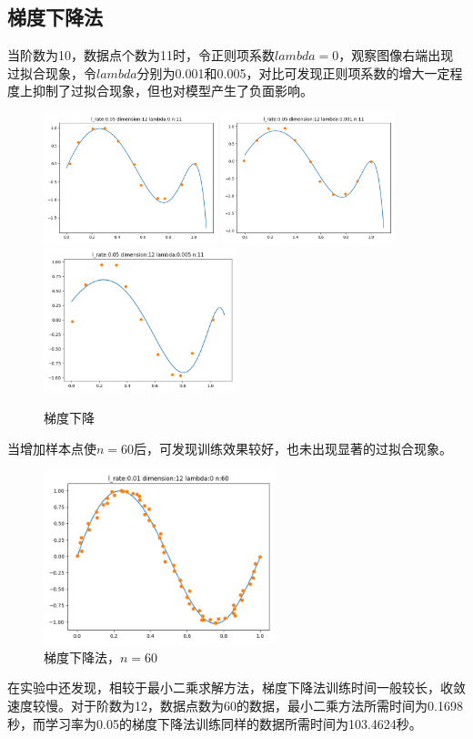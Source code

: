 \documentclass[a4paper,11pt,UTF8]{ctexart}
\newcommand{\bottomcaption}{%
\setlength{\abovecaptionskip}{6pt}%
\setlength{\belowcaptionskip}{6pt}%
\caption}
\begin{document}
\subsection{梯度下降法}
当阶数为10，数据点个数为11时，令正则项系数$lambda = 0$，观察图像右端出现过拟合现象，令$lambda$分别为0.001和0.005，对比可发现正则项系数的增大一定程度上抑制了过拟合现象，但也对模型产生了负面影响。
\begin{figure}[htbp]
	\centering
	\includegraphics[width=0.45\textwidth]{2_1.png}
	\includegraphics[width=0.45\textwidth]{2_2.png}
	\includegraphics[width=0.5\textwidth]{2_3.png}
	\bottomcaption{梯度下降}
\end{figure}
当增加样本点使$n = 60$后，可发现训练效果较好，也未出现显著的过拟合现象。
\begin{figure}[htbp]
	\centering
	\includegraphics[width=0.6\textwidth]{2_4.png}
	\bottomcaption{梯度下降法，$n=60$}
\end{figure}
在实验中还发现，相较于最小二乘求解方法，梯度下降法训练时间一般较长，收敛速度较慢。对于阶数为12，数据点数为60的数据，最小二乘方法所需时间为0.1698秒，而学习率为0.05的梯度下降法训练同样的数据所需时间为103.4624秒。
\end{document}
